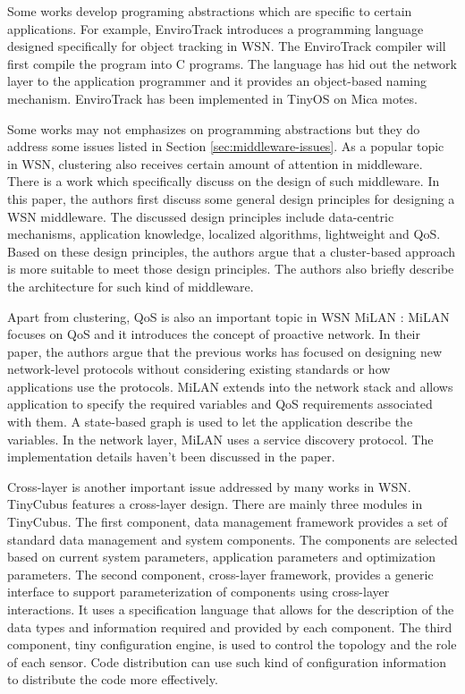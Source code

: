 Some works develop programing abstractions which are specific to certain applications. For example, EnviroTrack \cite{envirotrack} introduces a programming language designed specifically for object tracking in WSN. The EnviroTrack compiler will first compile the program into C programs. The language has hid out the network layer to the application programmer and it provides an object-based naming mechanism. EnviroTrack has been implemented in TinyOS on Mica motes.

Some works may not emphasizes on programming abstractions but they do address some issues listed in Section \ref{sec:middleware-issues}. As a popular topic in WSN, clustering also receives certain amount of attention in middleware. There is a work \cite{clustermiddleware} which specifically discuss on the design of such middleware. In this paper, the authors first discuss some general design principles for designing a WSN middleware. The discussed design principles include data-centric mechanisms, application knowledge, localized algorithms, lightweight and QoS. Based on these design principles, the authors argue that a cluster-based approach is more suitable to meet those design principles. The authors also briefly describe the architecture for such kind of middleware.

Apart from clustering, QoS is also an important topic in WSN MiLAN \cite{milan}: MiLAN focuses on QoS and it introduces the concept of proactive network. In their paper, the authors argue that the previous works has focused on designing new network-level protocols without considering existing standards or how applications use the protocols. MiLAN extends into the network stack and allows application to specify the required variables and QoS requirements associated with them. A state-based graph is used to let the application describe the variables. In the network layer, MiLAN uses a service discovery protocol. The implementation details haven't been discussed in the paper.

Cross-layer is another important issue addressed by many works in WSN. TinyCubus \cite{tinycubus} features a cross-layer design. There are mainly three modules in TinyCubus. The first component, data management framework provides a set of standard data management and system components. The components are selected based on current system parameters, application parameters and optimization parameters. The second component, cross-layer framework, provides a generic interface to support parameterization of components using cross-layer interactions. It uses a specification language that allows for the description of the data types and information required and provided by each component. The third component, tiny configuration engine, is used to control the topology and the role of each sensor. Code distribution can use such kind of configuration information to distribute the code more effectively.

